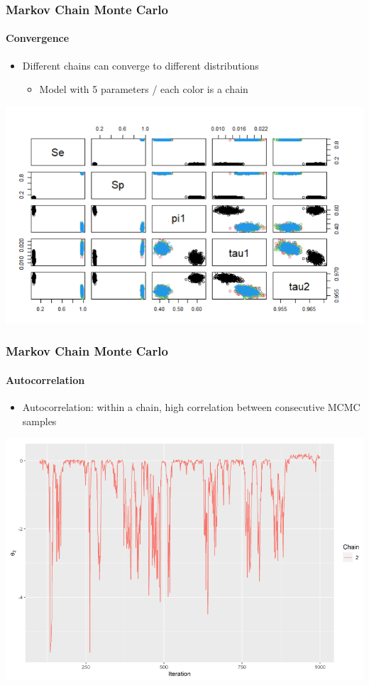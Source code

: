 \documentclass{beamer}
\begin{document}
\begin{frame}
\frametitle{Markov Chain Monte Carlo}
\framesubtitle{Convergence}
\begin{itemize}
 \item{Different chains can converge to different distributions}
 \begin{itemize}
  \item{Model with 5 parameters / each color is a chain}
 \end{itemize}
\end{itemize}
\includegraphics[width=\textwidth]{imgs/Stan_fail_1.png}
\end{frame}

\begin{frame}
\frametitle{Markov Chain Monte Carlo}
\framesubtitle{Autocorrelation}
\begin{itemize}
 \item{Autocorrelation: within a chain, high correlation between consecutive MCMC samples}
\end{itemize}
\includegraphics[width=\textwidth]{imgs/autocorrelation.png}

\end{frame}
\end{document}
